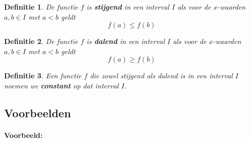 \documentclass[12pt,twoside]{article}
\newtheorem{definition}{Definitie}
\begin{document}
\begin{theorie}

\begin{definition}
  De functie $f$ is {\bf stijgend} in een interval $I$ als voor de $x$-waarden $a,b\in I$ met $a<b$ geldt
  $$f(a)\leq f(b)$$
\end{definition}

\begin{definition}
  De functie $f$ is {\bf dalend} in een interval $I$ als voor de $x$-waarden $a,b\in I$ met $a<b$ geldt
  $$f(a)\geq f(b)$$
\end{definition}

\begin{definition}
  Een functie $f$ die zowel stijgend als dalend is in een interval $I$ noemen we {\bf constant} op dat interval $I$.
\end{definition}

\subsection{Voorbeelden}

\paragraph{Voorbeeld:}\mbox{}


\end{theorie}
\end{document}
